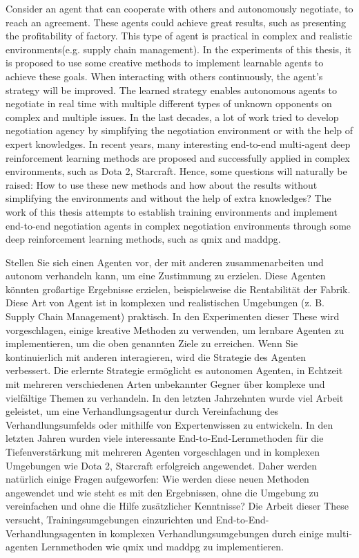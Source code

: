 
Consider an agent that can cooperate with others and autonomously negotiate, to reach an agreement. These agents could achieve great results, such as presenting the profitability of factory. This type of agent is practical in complex and realistic environments(e.g. supply chain management). In the experiments of this thesis, it is proposed to use some creative methods to implement learnable agents to achieve these goals. When interacting with others continuously, the agent’s strategy will be improved. The learned strategy enables autonomous agents to negotiate in real time with multiple different types of unknown opponents on complex and multiple issues. In the last decades, a lot of work tried to develop negotiation agency by simplifying the negotiation environment or with the help of expert knowledges. In recent years, many interesting end-to-end multi-agent deep reinforcement learning methods are proposed and successfully applied in complex environments, such as Dota 2, Starcraft. Hence, some questions will naturally be raised: How to use these new methods and how about the results without simplifying the environments and without the help of extra knowledges? The work of this thesis attempts to establish training environments and implement end-to-end negotiation agents in complex negotiation environments through some deep reinforcement learning methods, such as \gls{qmix} and \gls{maddpg}.


Stellen Sie sich einen Agenten vor, der mit anderen zusammenarbeiten und autonom verhandeln kann, um eine Zustimmung zu erzielen. Diese Agenten könnten großartige Ergebnisse erzielen, beispielsweise die Rentabilität der Fabrik. Diese Art von Agent ist in komplexen und realistischen Umgebungen (z. B. Supply Chain Management) praktisch. In den Experimenten dieser These wird vorgeschlagen, einige kreative Methoden zu verwenden, um lernbare Agenten zu implementieren, um die oben genannten Ziele zu erreichen. Wenn Sie kontinuierlich mit anderen interagieren, wird die Strategie des Agenten verbessert. Die erlernte Strategie ermöglicht es autonomen Agenten, in Echtzeit mit mehreren verschiedenen Arten unbekannter Gegner über komplexe und vielfältige Themen zu verhandeln. In den letzten Jahrzehnten wurde viel Arbeit geleistet, um eine Verhandlungsagentur durch Vereinfachung des Verhandlungsumfelds oder mithilfe von Expertenwissen zu entwickeln. In den letzten Jahren wurden viele interessante End-to-End-Lernmethoden für die Tiefenverstärkung mit mehreren Agenten vorgeschlagen und in komplexen Umgebungen wie Dota 2, Starcraft erfolgreich angewendet. Daher werden natürlich einige Fragen aufgeworfen: Wie werden diese neuen Methoden angewendet und wie steht es mit den Ergebnissen, ohne die Umgebung zu vereinfachen und ohne die Hilfe zusätzlicher Kenntnisse? Die Arbeit dieser These versucht, Trainingsumgebungen einzurichten und End-to-End-Verhandlungsagenten in komplexen Verhandlungsumgebungen durch einige multi-agenten Lernmethoden wie \gls{qmix} und \gls{maddpg} zu implementieren.
